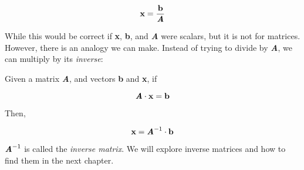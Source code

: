 $$\textbf{x} = \frac{\textbf{b}}{\textbf{\textit{A}}}$$

While this would be correct if \textbf{x}, \textbf{b}, and \textbf{\textit{A}} were scalars, but it is not for matrices. However, there is an analogy we can make. Instead of trying to divide by \textbf{\textit{A}}, we can multiply by its \textit{inverse}:

\begin{mdframed}[style = important, frametitle = {Inverse Matrices}]
Given a matrix \textbf{\textit{A}}, and vectors \textbf{b} and \textbf{x}, if

$$\textbf{\textit{A}} \cdot \textbf{x} = \textbf{b}$$

Then,

$$\textbf{x} = \textbf{\textit{A}}^{-1} \cdot \textbf{b}$$
\end{mdframed}

$\textbf{\textit{A}}^{-1}$ is called the \textit{inverse matrix}. We will explore inverse matrices and how to find them in the next chapter.

